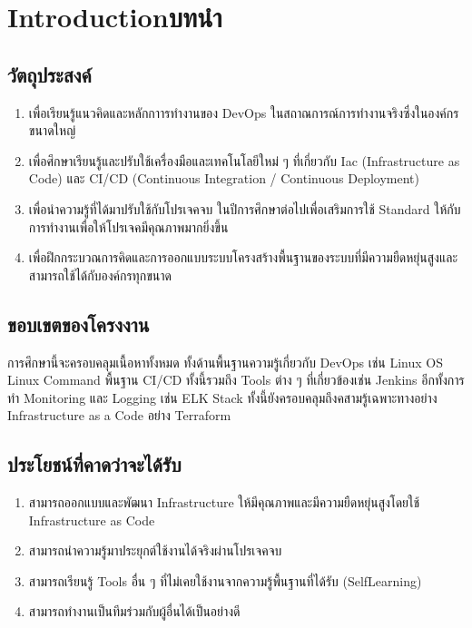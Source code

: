 \chapter{\ifenglish Introduction\else บทนำ\fi}

\section{วัตถุประสงค์}
\begin{enumerate}
    \item เพื่อเรียนรู้แนวคิดและหลักกาารทำงานของ DevOps ในสถาณการณ์การทำงานจริงซึ่งในองค์กรขนาดใหญ่
    \item เพื่อศึกษาเรียนรู้และปรับใช้เครื่องมือและเทคโนโลยีใหม่ ๆ ที่เกี่ยวกับ Iac (Infrastructure as Code) และ CI/CD (Continuous Integration / Continuous Deployment)
    \item เพื่อนำความรู้ที่ได้มาปรับใช้กับโปรเจคจบ ในปีการศึกษาต่อไปเพื่อเสริมการใช้ Standard ให้กับการทำงานเพื่อให้โปรเจคมีคุณภาพมากยิ่งขึ้น
    \item เพื่อฝึกกระบวณการคิดและการออกแบบระบบโครงสร้างพื้นฐานของระบบที่มีความยืดหยุ่นสูงและสามารถใช้ได้กับองค์กรทุกขนาด
\end{enumerate}

\section{ขอบเขตของโครงงาน}
การศึกษานี้จะครอบคลุมเนื้อหาทั้งหมด ทั้งด้านพื้นฐานความรู้เกี่ยวกับ DevOps เช่น Linux OS Linux Command พื้นฐาน CI/CD ทั้งนี้รวมถึง Tools ต่าง ๆ ที่เกี่ยวข้องเช่น Jenkins อีกทั้งการทำ Monitoring และ Logging เช่น ELK Stack ทั้งนี้ยังครอบคลุมถึงคสามรู้เฉพาะทางอย่าง Infrastructure as a Code อย่าง Terraform

\section{ประโยชน์ที่คาดว่าจะได้รับ}
\begin{enumerate}
    \item สามารถออกแบบและพัฒนา Infrastructure ให้มีคุณภาพและมีความยืดหยุ่นสูงโดยใช้ Infrastructure as Code
    \item สามารถนำความรู้มาประยุกต์ใช้งานได้จริงผ่านโปรเจคจบ
    \item สามารถเรียนรู้ Tools อื่น ๆ ที่ไม่เคยใช้งานจากความรู้พื้นฐานที่ได้รับ (Self\-Learning)
    \item สามารถทำงานเป็นทีมร่วมกับผู้อื่นได้เป็นอย่างดี
\end{enumerate}


